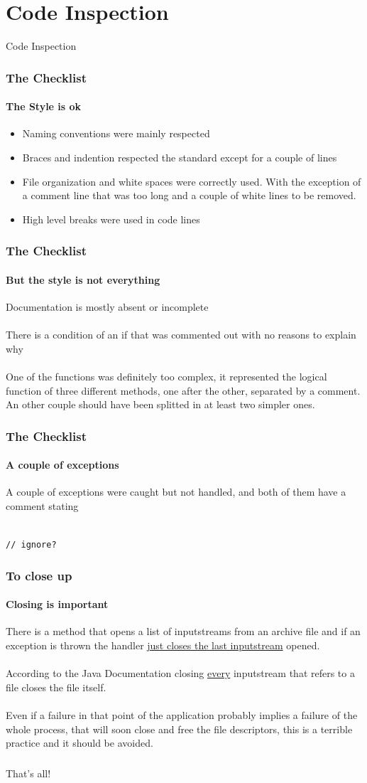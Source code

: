 \documentclass[10pt,xcolor={usenames,dvipsnames}]{beamer}
\begin{document}
\section[Section]{Code Inspection}
\begin{frame}
	\begin{center}
		Code Inspection
	\end{center}
\end{frame}
\begin{frame}
	\frametitle{The Checklist}
	\framesubtitle{The Style is ok}
	\begin{itemize}
		\item Naming conventions were mainly respected
		\item Braces and indention respected the standard except for a couple of lines
		\item File organization and white spaces were correctly used. With the exception of a comment line that was too long and a couple of white lines to be removed.
		\item High level breaks were used in code lines
	\end{itemize}
\end{frame}
\begin{frame}
	\frametitle{The Checklist}
	\framesubtitle{But the style is not everything}
	Documentation is mostly absent or incomplete\\
	\-\\
	There is a condition of an if that was commented out with no reasons to explain why\\
	\-\\
	One of the functions was definitely too complex, it represented the logical function of three different methods, one after the other, separated by a comment.\\
	An other couple should have been splitted in at least two simpler ones.
\end{frame}
\begin{frame}
	\frametitle{The Checklist}
	\framesubtitle{A couple of exceptions}
	A couple of exceptions were caught but not handled, and both of them have a comment stating\\
	\-\\
	{\begin{center}
			\color{Green}
			\texttt{// ignore?}
		\end{center}
	}
\end{frame}
\begin{frame}
	\frametitle{To close up}
	\framesubtitle{Closing is important}
	There is a method that opens a list of inputstreams from an archive file and if an exception is thrown the handler \underline{just closes the last inputstream} opened.\\
	\-\\
	According to the Java Documentation closing \underline{every} inputstream that refers to a file closes the file itself.\\
	\-\\
	Even if a failure in that point of the application probably implies a failure of the whole process, that will soon close and free the file descriptors, this is a terrible practice and it should be avoided.
\end{frame}
\begin{frame}
	\frametitle{}
	\framesubtitle{}
	{\Huge
		\begin{center}
			That's all!
		\end{center}
	}
\end{frame}
\end{document}
